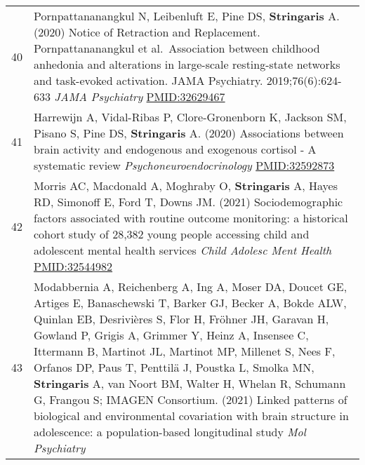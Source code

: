\documentclass[
]{article}
\begin{document}
\begin{longtable}[]{@{}ll@{}}
\begin{minipage}[t]{0.01\columnwidth}
40\strut
\end{minipage} & \begin{minipage}[t]{0.94\columnwidth}\raggedright
Pornpattananangkul N, Leibenluft E, Pine DS, \textbf{Stringaris} A.
(2020) Notice of Retraction and Replacement. Pornpattananangkul et
al.~Association between childhood anhedonia and alterations in
large-scale resting-state networks and task-evoked activation. JAMA
Psychiatry. 2019;76(6):624-633 \emph{JAMA Psychiatry}
\url{PMID:32629467}\strut
\end{minipage}\tabularnewline
\begin{minipage}[t]{0.01\columnwidth}\raggedright
41\strut
\end{minipage} & \begin{minipage}[t]{0.94\columnwidth}\raggedright
Harrewijn A, Vidal-Ribas P, Clore-Gronenborn K, Jackson SM, Pisano S,
Pine DS, \textbf{Stringaris} A. (2020) Associations between brain
activity and endogenous and exogenous cortisol - A systematic review
\emph{Psychoneuroendocrinology} \url{PMID:32592873}\strut
\end{minipage}\tabularnewline
\begin{minipage}[t]{0.01\columnwidth}\raggedright
42\strut
\end{minipage} & \begin{minipage}[t]{0.94\columnwidth}\raggedright
Morris AC, Macdonald A, Moghraby O, \textbf{Stringaris} A, Hayes RD,
Simonoff E, Ford T, Downs JM. (2021) Sociodemographic factors associated
with routine outcome monitoring: a historical cohort study of 28,382
young people accessing child and adolescent mental health services
\emph{Child Adolesc Ment Health} \url{PMID:32544982}\strut
\end{minipage}\tabularnewline
\begin{minipage}[t]{0.01\columnwidth}\raggedright
43\strut
\end{minipage} & \begin{minipage}[t]{0.94\columnwidth}\raggedright
Modabbernia A, Reichenberg A, Ing A, Moser DA, Doucet GE, Artiges E,
Banaschewski T, Barker GJ, Becker A, Bokde ALW, Quinlan EB, Desrivières
S, Flor H, Fröhner JH, Garavan H, Gowland P, Grigis A, Grimmer Y, Heinz
A, Insensee C, Ittermann B, Martinot JL, Martinot MP, Millenet S, Nees
F, Orfanos DP, Paus T, Penttilä J, Poustka L, Smolka MN,
\textbf{Stringaris} A, van Noort BM, Walter H, Whelan R, Schumann G,
Frangou S; IMAGEN Consortium. (2021) Linked patterns of biological and
environmental covariation with brain structure in adolescence: a
population-based longitudinal study \emph{Mol Psychiatry}

\end{minipage}
\end{longtable}
\end{document}

